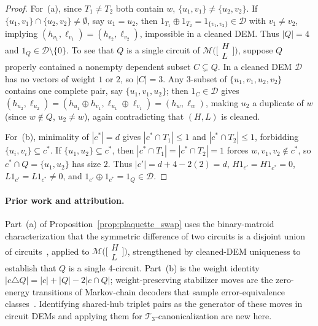 \documentclass[12pt]{article}
\theoremstyle{definition}
\newcommand{\Dc}{\mathcal{D}}
\newcommand{\Tc}{\mathcal{T}_3}
\begin{document}
\begin{proof}
For~(a), since $T_1 \neq T_2$ both contain $w$, $\{u_1, v_1\} \neq \{u_2, v_2\}$. If $\{u_1, v_1\} \cap \{u_2,
v_2\} \neq \emptyset$, say $u_1 = u_2$, then $1_{T_1} \oplus 1_{T_2} = 1_{\{v_1, v_2\}} \in \Dc$ with $v_1 \neq
v_2$, implying $(h_{v_1}, \ell_{v_1}) = (h_{v_2}, \ell_{v_2})$, impossible in a cleaned DEM. Thus $|Q| = 4$ and
$1_Q \in \Dc \setminus \{0\}$. To see that $Q$ is a single circuit of
$\mathcal{M}\bigl(\bigl[\begin{smallmatrix} H \\ L \end{smallmatrix}\bigr]\bigr)$, suppose $Q$ properly contained a
nonempty dependent subset $C \subsetneq Q$. In a cleaned DEM $\Dc$ has no vectors of weight $1$ or $2$, so $|C| = 3$.
Any $3$-subset of $\{u_1, v_1, u_2, v_2\}$ contains one complete pair, say $\{u_1, v_1, u_2\}$; then $1_C \in \Dc$
gives $(h_{u_2}, \ell_{u_2}) = (h_{u_1} \oplus h_{v_1}, \ell_{u_1} \oplus \ell_{v_1}) = (h_w, \ell_w)$, making $u_2$
a duplicate of $w$ (since $w \notin Q$, $u_2 \neq w$), again contradicting that $(H, L)$ is cleaned.

For~(b), minimality of $|c^*| = d$ gives $|c^* \cap T_1| \le 1$ and $|c^* \cap T_2| \le 1$, forbidding $\{u_i, v_i\}
\subseteq c^*$. If $\{u_1, u_2\} \subseteq c^*$, then $|c^* \cap T_1| = |c^* \cap T_2| = 1$ forces $w, v_1, v_2
\notin c^*$, so $c^* \cap Q = \{u_1, u_2\}$ has size $2$. Thus $|c'| = d + 4 - 2(2) = d$, $H 1_{c'} = H 1_{c^*} =
0$, $L 1_{c'} = L 1_{c^*} \neq 0$, and $1_{c'} \oplus 1_{c^*} = 1_Q \in \Dc$.
\end{proof}

\paragraph{Prior work and attribution.}
Part~(a) of Proposition~\ref{prop:plaquette_swap} uses the binary-matroid characterization that the symmetric
difference of two circuits is a disjoint union of circuits~\cite[Thm.~9.1.2]{Oxley2011}, applied to
$\mathcal{M}\bigl(\bigl[\begin{smallmatrix} H \\ L \end{smallmatrix}\bigr]\bigr)$, strengthened by cleaned-DEM
uniqueness to establish that $Q$ is a single 4-circuit. Part~(b) is the weight identity $|c \triangle Q| = |c| +
|Q| - 2|c \cap Q|$; weight-preserving stabilizer moves are the zero-energy transitions of Markov-chain decoders
that sample error-equivalence classes~\cite{WoottonLoss2012,HutterWoottonLoss2014}. Identifying shared-hub triplet
pairs as the generator of these moves in circuit DEMs and applying them for $\Tc$-canonicalization are new here.
\end{document}
